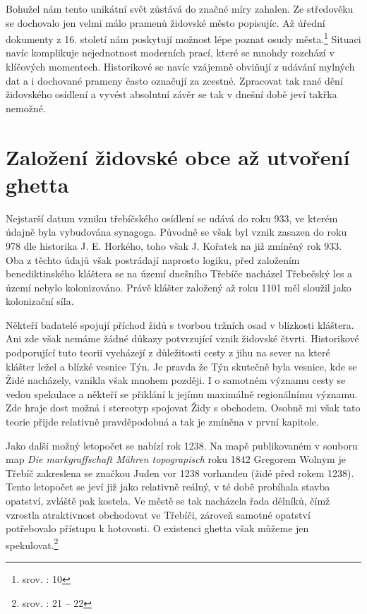 \documentclass[a4paper,oneside,12p]{report}
\begin{document}
Bohužel nám tento unikátní svět zůstává do značné míry zahalen.
Ze středověku se dochovalo jen velmi málo pramenů židovské město popisujíc.
Až úřední dokumenty z 16. století nám poskytují možnost lépe poznat osudy města.\footnote{srov. : 10}
Situaci navíc komplikuje nejednotnost moderních prací, které se mnohdy rozchází v klíčových momentech.
Historikové se navíc vzájemně obviňují z udávání mylných dat a i dochované prameny často označují za zcestné.
Zpracovat tak rané dění židovského osídlení a vyvést absolutní závěr se tak v dnešní době jeví takřka nemožné.

\section{Založení židovské obce až utvoření ghetta}

Nejstarší datum vzniku třebíčského osídlení se udává do roku 933, ve kterém údajně byla vybudována synagoga.
Původně se však byl vznik zasazen do roku 978 dle historika J. E. Horkého, toho však J. Kořatek  na již zmíněný rok 933.
Oba z těchto údajů však postrádají naprosto logiku, před založením benediktinského kláštera se na území dnešního Třebíče nacházel Třebečský les a území nebylo kolonizováno.
Právě klášter založený až roku 1101 měl sloužil jako kolonizační síla.

Někteří badatelé spojují příchod židů s tvorbou tržních osad v blízkosti kláštera.
Ani zde však nemáme žádné důkazy potvrzující vznik židovské čtvrti.
Historikové podporující tuto teorii vycházejí z důležitosti cesty z jihu na sever na které klášter ležel a blízké vesnice Týn.
Je pravda že Týn skutečně byla vesnice, kde se Židé nacházely, vznikla však mnohem později.
I o samotném významu cesty se vedou spekulace a někteří se přiklání k jejímu maximálně regionálnímu významu.
Zde hraje dost možná i stereotyp spojovat Židy s obchodem.
Osobně mi však tato teorie přijde relativně pravděpodobná a tak je zmíněna v první kapitole.

Jako další možný letopočet se nabízí rok 1238.
Na mapě publikovaném v souboru map \textit{Die markgraffschaft Mähren topograpisch} roku 1842 Gregorem Wolnym je Třebíč zakreslena se značkou Juden vor 1238 vorhanden (židé před rokem 1238).
Tento letopočet se jeví již jako relativně reálný, v té době probíhala stavba opatství, zvláště pak kostela.
Ve městě se tak nacházela řada dělníků, čímž vzrostla atraktivnost obchodovat ve Třebíči, zároveň samotné opatství potřebovalo přístupu k hotovosti.
O existenci ghetta však můžeme jen spekulovat.\footnote{srov. \cite{Fiser2005}: 21 -- 22}
\end{document}
